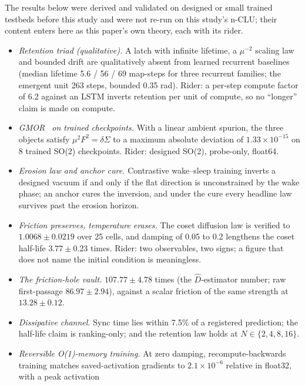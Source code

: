 \documentclass{article} %
\newcommand{\sci}[2]{\ensuremath{#1\times10^{#2}}}
\begin{document}
The results below were derived and validated on designed or small trained testbeds before this
study and were not re-run on this study's n-CLU; their content enters here as this paper's own
theory, each with its rider. %
\begin{itemize}
\item \emph{Retention triad (qualitative).} A latch with infinite lifetime, a $\mu^{-2}$ scaling
law and bounded drift are qualitatively absent from learned recurrent baselines (median lifetime 5.6
  / 56 / 69 map-steps for three recurrent families; the emergent unit 263 steps, bounded 0.35 rad).
  Rider: a per-step compute factor of 6.2 against an LSTM inverts retention per unit of compute, so
  no ``longer'' claim is made on compute. %
\item \emph{GMOR~\citep{gell-mann_behavior_1968} on trained checkpoints.} With a linear ambient spurion, the three objects satisfy
  $\mu^2F^2=\delta\Sigma$ to a maximum absolute deviation of \sci{1.33}{-15} on 8 trained SO(2)
  checkpoints. Rider: designed SO(2), probe-only, float64. %
\item \emph{Erosion law and anchor cure.} Contrastive wake--sleep training inverts a designed
  vacuum if and only if the flat direction is unconstrained by the wake phase; an anchor cures the
  inversion, and under the cure every headline law survives past the erosion horizon. %
\item \emph{Friction preserves, temperature erases.} The coset diffusion law is verified to
  $1.0068\pm0.0219$ over 25 cells, and damping of 0.05 to 0.2 lengthens the coset half-life
  $3.77\pm0.23$ times. Rider: two observables, two signs; a figure that does not name the initial
  condition is meaningless. %
\item \emph{The friction-hole vault.} $107.77\pm4.78$ times (the $\hat D$-estimator number; raw
  first-passage $86.97\pm2.94$), against a scalar friction of the same strength at
  $13.28\pm0.12$. %
\item \emph{Dissipative channel.} Sync time lies within 7.5\% of a registered prediction; the half-life
  claim is ranking-only; and the retention law holds at $N\in\{2,4,8,16\}$. %
\item \emph{Reversible O(1)-memory training.} At zero damping, recompute-backwards training
  matches saved-activation gradients to \sci{2.1}{-6} relative in float32, with a peak activation

\end{itemize}
\end{document}
